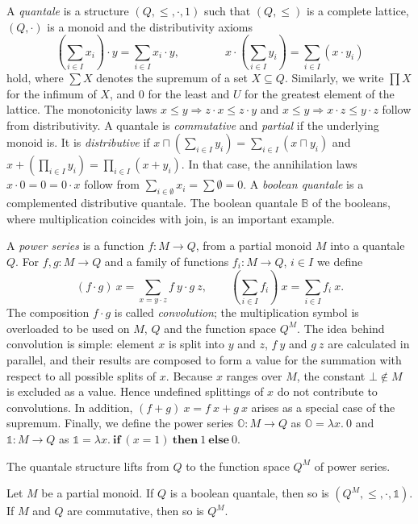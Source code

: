 \documentclass[twoside,runningheads,envcountsame,envcountsect,oribibl,orivec]{llncs}
\def \unit {\mathbb{1}}
\def \zero {\mathbb{O}}
\begin{document}
A \emph{quantale} is a structure $(Q,\le,\cdot,1)$ such that $(Q,\le)$
is a complete lattice, $(Q,\cdot)$ is a monoid and the distributivity
axioms
\begin{equation*}
	(\sum_{i\in I} x_i)\cdot y  = \sum_{i\in I} x_i\cdot y,\qquad\qquad 
   x\cdot (\sum_{i\in I}y_i)  =  \sum_{i\in I} (x\cdot y_i)
\end{equation*}
hold, where $\sum X$ denotes the supremum of a set $X\subseteq
Q$. Similarly, we write $\prod X$ for the infimum of $X$, and $0$ for
the least and $U$ for the greatest element of the lattice.  The
monotonicity laws $ x \le y \Rightarrow z\cdot x \le z\cdot y$ and
$x\le y \Rightarrow x\cdot z \le y\cdot z$ follow from distributivity.
A quantale is \emph{commutative} and \emph{partial} if the underlying
monoid is. It is \emph{distributive} if $x\sqcap (\sum_{i\in I} y_i)
=\sum_{i\in I} (x\sqcap y_i)$ and $x+ (\prod_{i\in I} y_i) =
\prod_{i\in I} (x+ y_i)$. In that case, the annihilation laws $x \cdot
0 = 0 =0 \cdot x$ follow from $\sum_{i\in\emptyset} x_i = \sum
\emptyset = 0$.  A \emph{boolean quantale} is a complemented
distributive quantale. The boolean quantale $\mathbb{B}$ of the
booleans, where multiplication coincides with join, is an important
example.

A \emph{power series} is a function $f:M\to Q$, from a
partial monoid $M$ into a quantale $Q$.  For $f,g:M\to Q$ and a family of functions
$f_i:M\to Q$, $i\in I$ we define
 \begin{equation*}
(f\cdot g)\ x =  \sum_{x=y\cdot z} f\ y\cdot g\ z,\qquad (\sum_{i\in I} f_i)\ x  = \sum_{i\in I} f_i\ x.
 \end{equation*}
 The composition $f\cdot g$ is called \emph{convolution}; the
 multiplication symbol is overloaded to be used on $M$, $Q$ and the
 function space $Q^M$.  The idea behind convolution is simple: element
 $x$ is split into $y$ and $z$, $f\ y$ and $g\ z$ are calculated in
 parallel, and their results are composed to form a value for the
 summation with respect to all possible splits of $x$. Because $x$
 ranges over $M$, the constant $\bot\notin M$ is excluded as a
 value. Hence undefined splittings of $x$ do not contribute to
 convolutions. In addition, $(f+g)\ x = f\ x + g\ x$ arises as a
 special case of the supremum.  Finally, we define the power series
 $\zero:M\to Q$ as $\zero = \lambda x.\ 0$ and $\unit:M\to Q$ as
 $\unit = \lambda x.\ \textbf{if}\ (x = 1)\ \textbf{then}\ 1\
 \textbf{else}\ 0$.

 The quantale structure lifts from $Q$ to the function space $Q^M$ of
 power series.
\begin{theorem}\label{thm:quantale-lifting} 
  Let $M$ be a partial monoid. If $Q$ is a boolean quantale, then so
  is $(Q^M,\le,\cdot,\unit)$. If $M$ and $Q$ are commutative, then so is $Q^M$.
\end{theorem}
\end{document}
